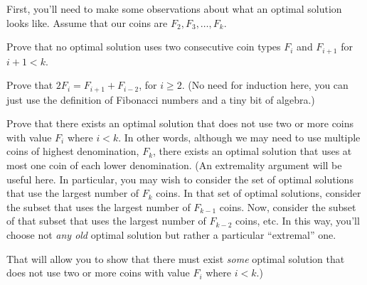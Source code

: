 \documentclass{ks-pset}
\begin{document}
\begin{problem}
  \begin{subproblems}
    \item First, you'll need to make some observations about what an optimal
      solution looks like.  Assume that our coins are $F_2, F_3, \dots, F_k$.
      \begin{subproblems}

        \item Prove that no optimal solution uses two consecutive coin types
          $F_{i}$ and $F_{i+1}$ for $i+1 < k$.

        \item Prove that $2F_{i} = F_{i+1} + F_{i-2}$, for $i ≥ 2$.  (No need
          for induction here, you can just use the definition of Fibonacci
          numbers and a tiny bit of algebra.)

        \item \label{part:safe} Prove that there exists an optimal solution
          that does not use two or more coins with value $F_i$ where $i < k$.
          In other words, although we may need to use multiple coins of highest
          denomination, $F_k$, there exists an optimal solution that uses at
          most one coin of each lower denomination.  (An extremality argument
          will be useful here.  In particular, you may wish to consider the set
          of optimal solutions that use the largest number of $F_k$ coins.  In
          that set of optimal solutions, consider the subset that uses the
          largest number of $F_{k-1}$ coins.  Now, consider the subset of that
          subset that uses the largest number of $F_{k-2}$ coins, etc.  In this
          way, you'll choose not \emph{any old} optimal solution but rather a
          particular ``extremal'' one.

          That will allow you to show that there must exist \emph{some} optimal
          solution that does not use two or more coins with value $F_i$ where $i <
          k$.)
      \end{subproblems}


\end{subproblems}
\end{problem}
\end{document}
